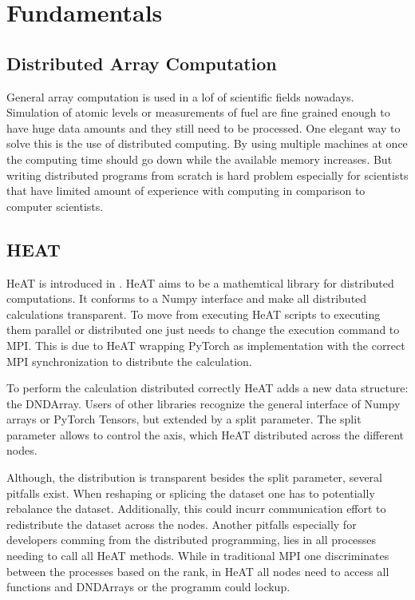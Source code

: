 \section{Fundamentals}
\label{sec:fundamentals}

\subsection{Distributed Array Computation}
\label{ssec:distributed_array_computation}
General array computation is used in a lof of scientific fields nowadays.
Simulation of atomic levels or measurements of fuel are fine grained enough to have huge data amounts
and they still need to be processed.
One elegant way to solve this is the use of distributed computing. By using multiple machines at once
the computing time should go down while the available memory increases.
But writing distributed programs from scratch is hard problem especially for scientists that have limited amount
of experience with computing in comparison to computer scientists.


\subsection{HEAT}
\label{ssec:heat}
\gls{HeAT} is introduced in \cite{krajsek_helmholtz_nodate}. HeAT aims to be a mathemtical library for distributed computations.
It conforms to a Numpy \cite{noauthor_numpy_nodate} interface and make all distributed calculations transparent. To move from executing \gls{HeAT} scripts to executing them parallel
or distributed one just needs to change the execution command to MPI.
This is due to \gls{HeAT} wrapping PyTorch as implementation with the correct \gls{MPI} synchronization to distribute the calculation.

To perform the calculation distributed correctly \gls{HeAT} adds a new data structure: the DNDArray. Users of other libraries
recognize the general interface of Numpy arrays or PyTorch Tensors, but extended by a split parameter.
The split parameter allows to control the axis, which \gls{HeAT} distributed across the different nodes.

Although, the distribution is transparent besides the split parameter, several pitfalls exist.
When reshaping or splicing the dataset one has to potentially rebalance the dataset. Additionally, this could incurr communication effort
to redistribute the dataset across the nodes.
Another pitfalls especially for developers comming from the distributed programming, lies in all processes needing to call all \gls{HeAT} methods.
While in traditional \gls{MPI} one discriminates between the processes based on the rank, in \gls{HeAT} all nodes need to access all functions and DNDArrays or the
programm could lockup.

